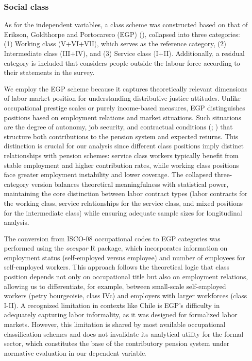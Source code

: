 \documentclass[
  12pt,
]{article}
\begin{document}
\subsubsection{Social class}\label{social-class}

As for the independent variables, a class scheme was constructed based
on that of Erikson, Goldthorpe and Portocarero (EGP)
(),
collapsed into three categories: (1) Working class (V+VI+VII), which
serves as the reference category, (2) Intermediate class (III+IV), and
(3) Service class (I+II). Additionally, a residual category is included
that considers people outside the labour force according to their
statements in the survey.

We employ the EGP scheme because it captures theoretically relevant
dimensions of labor market position for understanding distributive
justice attitudes. Unlike occupational prestige scales or purely
income-based measures, EGP distinguishes positions based on employment
relations and market situations. Such situations are the degree of
autonomy, job security, and contractual conditions
(;
) that
structure both contributions to the pension system and expected returns.
This distinction is crucial for our analysis since different class
positions imply distinct relationships with pension schemes: service
class workers typically benefit from stable employment and higher
contribution rates, while working class positions face greater
employment instability and lower coverage. The collapsed three-category
version balances theoretical meaningfulness with statistical power,
maintaining the core distinction between labor contract types (labor
contracts for the working class, service relationships for the service
class, and mixed positions for the intermediate class) while ensuring
adequate sample sizes for longitudinal analysis.

The conversion from ISCO-08 occupational codes to EGP categories was
performed using the \emph{occupar} R package, which incorporates
information on employment status (self-employed versus employee) and
number of employees for self-employed workers. This approach follows the
theoretical logic that class position depends not only on occupational
title but also on employment relations, allowing us to differentiate,
for example, between small-scale self-employed workers (petty
bourgeoisie, class IVc) and employers with larger workforces (class
I-II). A recognized limitation in contexts like Chile is EGP's
difficulty in adequately capturing labor informality, as it was designed
for formalized labor markets. However, this limitation is shared by most
available occupational classification schemes and does not invalidate
its analytical utility for the formal sector, which constitutes the base
of the contributory pension system under normative evaluation in our
dependent variable.
\end{document}
